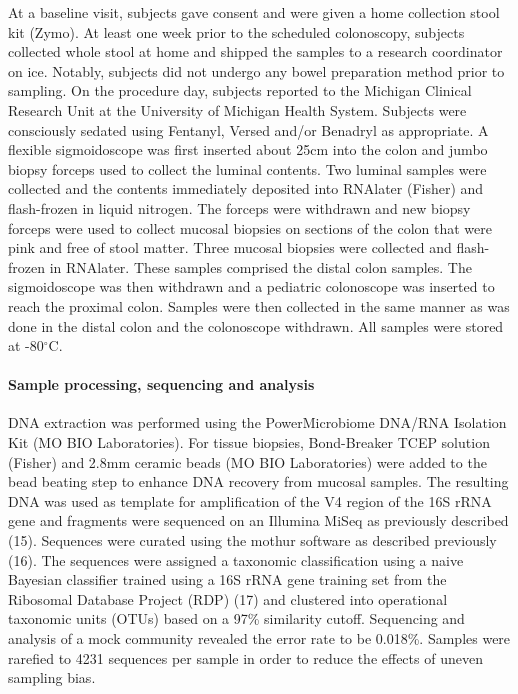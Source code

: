 \documentclass[12pt,]{article}
\let\oldparagraph\paragraph
\renewcommand{\paragraph}[1]{\oldparagraph{#1}\mbox{}}
\begin{document}
At a baseline visit, subjects gave consent and were given a home
collection stool kit (Zymo). At least one week prior to the scheduled
colonoscopy, subjects collected whole stool at home and shipped the
samples to a research coordinator on ice. Notably, subjects did not
undergo any bowel preparation method prior to sampling. On the procedure
day, subjects reported to the Michigan Clinical Research Unit at the
University of Michigan Health System. Subjects were consciously sedated
using Fentanyl, Versed and/or Benadryl as appropriate. A flexible
sigmoidoscope was first inserted about 25cm into the colon and jumbo
biopsy forceps used to collect the luminal contents. Two luminal samples
were collected and the contents immediately deposited into RNAlater
(Fisher) and flash-frozen in liquid nitrogen. The forceps were withdrawn
and new biopsy forceps were used to collect mucosal biopsies on sections
of the colon that were pink and free of stool matter. Three mucosal
biopsies were collected and flash-frozen in RNAlater. These samples
comprised the distal colon samples. The sigmoidoscope was then withdrawn
and a pediatric colonoscope was inserted to reach the proximal colon.
Samples were then collected in the same manner as was done in the distal
colon and the colonoscope withdrawn. All samples were stored at
-80\(^\circ\)C.

\paragraph{Sample processing, sequencing and
analysis}\label{sample-processing-sequencing-and-analysis}

DNA extraction was performed using the PowerMicrobiome DNA/RNA Isolation
Kit (MO BIO Laboratories). For tissue biopsies, Bond-Breaker TCEP
solution (Fisher) and 2.8mm ceramic beads (MO BIO Laboratories) were
added to the bead beating step to enhance DNA recovery from mucosal
samples. The resulting DNA was used as template for amplification of the
V4 region of the 16S rRNA gene and fragments were sequenced on an
Illumina MiSeq as previously described (15). Sequences were curated
using the mothur software as described previously (16). The sequences
were assigned a taxonomic classification using a naive Bayesian
classifier trained using a 16S rRNA gene training set from the Ribosomal
Database Project (RDP) (17) and clustered into operational taxonomic
units (OTUs) based on a 97\% similarity cutoff. Sequencing and analysis
of a mock community revealed the error rate to be 0.018\%. Samples were
rarefied to 4231 sequences per sample in order to reduce the effects of
uneven sampling bias.
\end{document}
